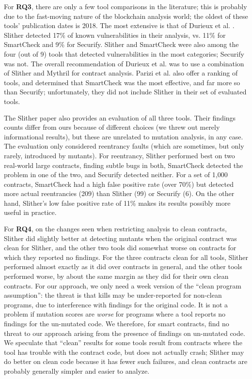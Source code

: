 For {\bf RQ3}, there are only a few tool comparisons in the literature; this is probably due to the fast-moving nature of the blockchain analysis world; the oldest of these tools' publication dates is 2018.  The most extensive is that of Durieux et al. \cite{durieux2019empirical}.  Slither detected 17\% of known vulnerabilities in their analysis, vs. 11\% for SmartCheck and 9\% for Securify. Slither and SmartCheck were also among the four (out of 9) tools that detected vulnerabilities in the most categories; Securify was not.  The overall recommendation of Durieux et al. was to use a combination of Slither and Mythril \cite{mythril-code} for contract analysis.  Parizi et al. \cite{Parizi} also offer a ranking of tools, and determined that SmartCheck was the most effective, and far more so than Securify; unfortunately, they did not include Slither in their set of evaluated tools.

The Slither paper \cite{slither} also provides an evaluation of all three tools.  Their findings counts differ from ours because of different choices (we threw out merely informational results), but these are unrelated to mutation analysis, in any case.  The evaluation only considered reentrancy faults \cite{SurveyAttacks,FC20} (which are sometimes, but only rarely, introduced by mutants).  For reentrancy, Slither performed best on two real-world large contracts, finding subtle bugs in both, SmartCheck detected the problem in one of the two, and Securify detected neither.  For a set of 1,000 contracts, SmartCheck had a high false positive rate (over 70\%) but detected more actual reentrancies (209) than Slither (99) or Securify (6).  On the other hand, Slither's low false positive rate of 11\%  makes its results possibly more useful in practice.

For {\bf RQ4}, on the changes seen when restricting analysis to clean contracts, Slither did slightly better at detecting mutants when the original contract was clean for Slither, and the other two tools did somewhat worse on contracts for which they reported no findings.  For the three contracts clean for all tools, Slither performed almost exactly as it did over contracts in general, and the other tools performed worse, by about the same margin as they did for their own clean contracts.  For our approach, we only need a week version of the ``clean program assumption'':  the threat is that kills may be under-reported for non-clean programs, due to interference with findings for the original code.  It is not a problem if mutation scores are \emph{worse} for programs where a tool reports no findings for the un-mutated code.  We therefore, for smart contracts, find no threat to our approach arising from the presence of findings on un-mutated code.  We speculate that ``clean'' results for some tools result from contracts where the tool has trouble with the contract code, but does not actually crash; Slither may do better on clean code because it has fewer such failures, and clean contracts are probably generally simpler and easier to analyze.

